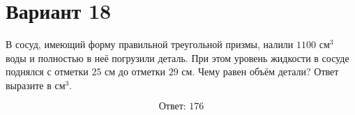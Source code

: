 \documentclass[12pt,a4paper]{article}
\begin{document}
\section*{Вариант 18}

В сосуд, имеющий форму правильной треугольной призмы, налили
\(1100\) см\(^{3}\) воды и полностью в неё погрузили деталь.
При этом уровень жидкости в сосуде поднялся с отметки \(25\) см
до отметки \(29\) см. Чему равен объём детали?
Ответ выразите в см\(^{3}\).

\begin{center}
\end{center}

\[
\boxed{\text{Ответ: }176}
\]
\end{document}
